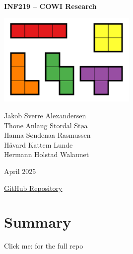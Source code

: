 \documentclass{article}
\begin{document}
\begin{titlepage}
    \centering
    \vspace*{1cm}
    
    
    
    
    
    {\Huge\bfseries INF219 – COWI Research \par}
    
    
    \vspace{1.5cm}
    \includegraphics[width=0.5\textwidth]{tetris.png} %
    \vspace{1cm}

    {\large Jakob Sverre Alexandersen \\
    Thone Anlaug Stordal Støa \\
    Hanna Søndenaa Rasmussen \\
    Håvard Kattem Lunde \\
    Hermann Holstad Walaunet \par}
    
    
    \vfill
    
    {\large April 2025 \par}
    
    \vspace{1cm}
    \href{https://github.com/alexandersen01/COWI-research}{ GitHub Repository}
\end{titlepage}


\newpage

\tableofcontents

\newpage

\section{Summary}

Click me: \href{https://github.com/alexandersen01/COWI-research}{} for the full repo

\hrulefill{}
\end{document}
